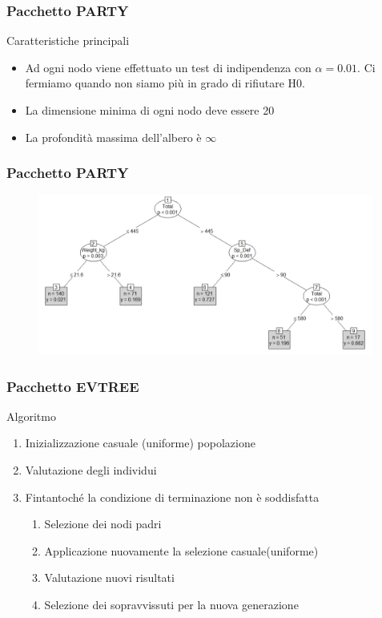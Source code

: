 	\begin{frame}
		\frametitle{Pacchetto PARTY}
		\begin{block}{Caratteristiche principali}
			\begin{itemize}
				\item Ad ogni nodo viene effettuato un test di indipendenza con $\alpha = 0.01$. Ci fermiamo quando non siamo più in grado di rifiutare H0.
				\item La dimensione minima di ogni nodo deve essere 20
				\item La profondità massima dell'albero è $\infty$
			\end{itemize}
		\end{block}
	\end{frame}

	\begin{frame}
		\frametitle{Pacchetto PARTY}
		\begin{center}
			\begin{figure}
				
			\end{figure}
			\begin{figure}
				\includegraphics[width=0.98\textwidth]{img/party}
			\end{figure}
		\end{center}
	\end{frame}

	\begin{frame}
		\frametitle{Pacchetto EVTREE}
		\begin{block}{Algoritmo}
			\begin{enumerate}
				\item Inizializzazione casuale (uniforme) popolazione
				\item Valutazione degli individui
				\item Fintantoché la condizione di terminazione non è soddisfatta
				\begin{enumerate}
					\item Selezione dei nodi padri
					\item Applicazione nuovamente la selezione casuale(uniforme)
					\item Valutazione nuovi risultati
					\item Selezione dei sopravvissuti per la nuova generazione
				\end{enumerate}
			\end{enumerate}
		\end{block}
	\end{frame}

